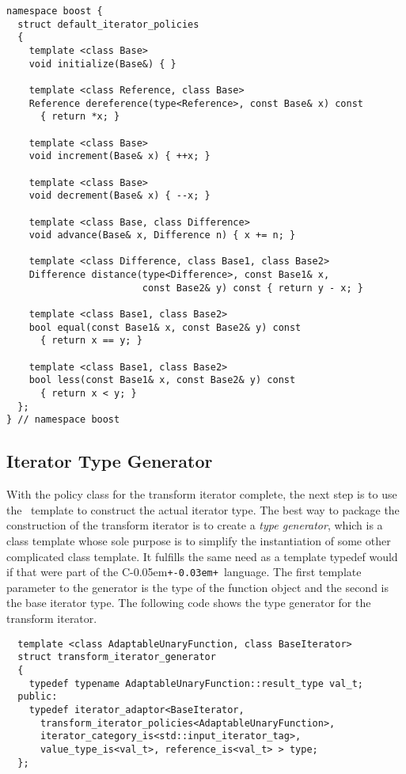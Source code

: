 \documentclass{netobjectdays}
\newcommand{\Cpp}{C\kern-0.05em\texttt{+\kern-0.03em+}}
\newcommand{\iteratoradaptor}{\code{iterator\_\-adaptor}}
\begin{document}
{\footnotesize
\begin{verbatim}
namespace boost {
  struct default_iterator_policies
  {
    template <class Base>
    void initialize(Base&) { }

    template <class Reference, class Base>
    Reference dereference(type<Reference>, const Base& x) const
      { return *x; }

    template <class Base>
    void increment(Base& x) { ++x; }

    template <class Base>
    void decrement(Base& x) { --x; }

    template <class Base, class Difference>
    void advance(Base& x, Difference n) { x += n; }

    template <class Difference, class Base1, class Base2>
    Difference distance(type<Difference>, const Base1& x,
                        const Base2& y) const { return y - x; }

    template <class Base1, class Base2>
    bool equal(const Base1& x, const Base2& y) const
      { return x == y; }

    template <class Base1, class Base2>
    bool less(const Base1& x, const Base2& y) const
      { return x < y; }
  };
} // namespace boost
\end{verbatim}
}


\subsection{Iterator Type Generator}
\label{sec:iter-type-generator}

With the policy class for the transform iterator complete, the next
step is to use the \iteratoradaptor\ template to construct the
actual iterator type. The best way to package the construction of the
transform iterator is to create a \emph{type generator}, which is a
class template whose sole purpose is to simplify the instantiation of
some other complicated class template. It fulfills the same need as a
template typedef would if that were part of the \Cpp\ language.  The
first template parameter to the generator is the type of the function
object and the second is the base iterator type.  The following code
shows the type generator for the transform iterator.

{\footnotesize
\begin{verbatim}
  template <class AdaptableUnaryFunction, class BaseIterator>
  struct transform_iterator_generator
  {
    typedef typename AdaptableUnaryFunction::result_type val_t;
  public:
    typedef iterator_adaptor<BaseIterator, 
      transform_iterator_policies<AdaptableUnaryFunction>,
      iterator_category_is<std::input_iterator_tag>, 
      value_type_is<val_t>, reference_is<val_t> > type;
  };
\end{verbatim}
}
\end{document}
